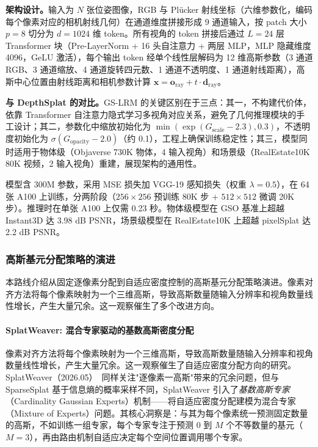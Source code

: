 \textbf{架构设计。}输入为 $N$ 张位姿图像，RGB 与 Pl\"ucker 射线坐标（六维参数化，编码每个像素对应的相机射线几何）在通道维度拼接形成 9 通道输入，按 patch 大小 $p{=}8$ 切分为 $d{=}1024$ 维 token。所有视角的 token 拼接后通过 $L{=}24$ 层 Transformer 块（Pre-LayerNorm + 16 头自注意力 + 两层 MLP，MLP 隐藏维度 4096，GeLU 激活），每个输出 token 经单个线性层解码为 12 维高斯参数（3 通道 RGB、3 通道缩放、4 通道旋转四元数、1 通道不透明度、1 通道射线距离），高斯中心位置由射线距离和相机参数计算 $\mathbf{x} = \mathbf{o}_{\text{ray}} + t \cdot \mathbf{d}_{\text{ray}}$。

\textbf{与 DepthSplat 的对比。}GS-LRM 的关键区别在于三点：其一，不构建代价体，依靠 Transformer 自注意力隐式学习多视角对应关系，避免了几何推理模块的手工设计；其二，参数化中缩放初始化为 $\min(\exp(G_{\text{scale}} - 2.3), 0.3)$，不透明度初始化为 $\sigma(G_{\text{opacity}} - 2.0)$（约 0.1），工程上确保训练稳定性；其三，模型同时适用于物体级（Objaverse 730K 物体，4 输入视角）和场景级（RealEstate10K 80K 视频，2 输入视角）重建，展现架构的通用性。

模型含 300M 参数，采用 MSE 损失加 VGG-19 感知损失（权重 $\lambda{=}0.5$），在 64 张 A100 上训练，分两阶段（$256{\times}256$ 预训练 80K 步 + $512{\times}512$ 微调 20K 步）。推理时在单张 A100 上仅需 0.23 秒。物体级模型在 GSO 基准上超越 Instant3D 达 3.98 dB PSNR，场景级模型在 RealEstate10K 上超越 pixelSplat 达 2.2 dB PSNR。

\subsubsection{高斯基元分配策略的演进}

本路线介绍从固定逐像素分配到自适应密度控制的高斯基元分配策略演进。像素对齐方法将每个像素映射为一个三维高斯，导致高斯数量随输入分辨率和视角数量线性增长，产生大量冗余。这一观察催生了多个改进方向。

\paragraph{SplatWeaver: 混合专家驱动的基数高斯密度分配}

像素对齐方法将每个像素映射为一个三维高斯，导致高斯数量随输入分辨率和视角数量线性增长，产生大量冗余。这一观察催生了自适应密度分配方向的研究。SplatWeaver（2026.05）~\cite{2605_07287}同样关注"逐像素一高斯"带来的冗余问题，但与 SparseSplat 基于信息熵的概率采样不同，SplatWeaver 引入了\emph{基数高斯专家}（Cardinality Gaussian Experts）机制——将自适应密度分配建模为混合专家（Mixture of Experts）问题。其核心洞察是：与其为每个像素统一预测固定数量的高斯，不如训练一组专家，每个专家专注于预测 0 到 $M$ 个不等数量的基元（$M{=}3$），再由路由机制自适应决定每个空间位置调用哪个专家。

